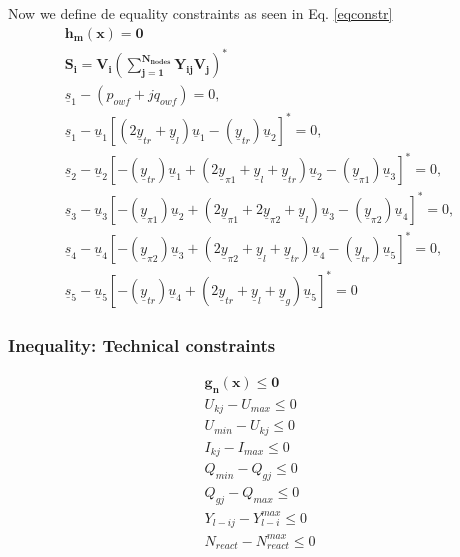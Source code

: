 \documentclass[a4paper,11pt, titlepage, twoside]{article}
\begin{document}
Now we define de equality constraints as seen in  Eq. \ref{eqconstr}
\begin{gather}
    \mathbf{h_m(x) = 0 } \label{eqconstr} \\
    \mathbf{S_i} = \mathbf{V_i(\sum_{j=1}^{N_{nodes}}Y_{ij}V_j)^*} \\
    \underline{s}_1-(p_{owf}+jq_{owf}) = 0, \nonumber \\
    \underline{s}_1-\underline{u}_1[(2\underline{y}_{tr}+\underline{y}_l)\underline{u}_1-(\underline{y}_{tr})\underline{u}_2]^* = 0, \nonumber \\
    \underline{s}_2-\underline{u}_2[-(\underline{y}_{tr})\underline{u}_1+(2\underline{y}_{\pi1}+\underline{y}_l+\underline{y}_{tr})\underline{u}_2-(\underline{y}_{\pi1})\underline{u}_3]^* = 0, \nonumber \\
    \underline{s}_3-\underline{u}_3[-(\underline{y}_{\pi1})\underline{u}_2+(2\underline{y}_{\pi1}+2\underline{y}_{\pi2}+\underline{y}_{l})\underline{u}_3-(\underline{y}_{\pi2})\underline{u}_4]^* = 0, \nonumber \\
    \underline{s}_4-\underline{u}_4[-(\underline{y}_{\pi2})\underline{u}_3+(2\underline{y}_{\pi2}+\underline{y}_l+\underline{y}_{tr})\underline{u}_4-(\underline{y}_{tr})\underline{u}_5]^* = 0, \nonumber \\
    \underline{s}_5-\underline{u}_5[-(\underline{y}_{tr})\underline{u}_4+(2\underline{y}_{tr}+\underline{y}_l+\underline{y}_{g})\underline{u}_5]^* = 0
\end{gather}

\newpage



\subsubsection{Inequality: Technical constraints}\label{inequality}

\begin{gather}
    \mathbf{g_n(x)\leq0} \\
    U_{kj}-U_{max}\leq0 \\
    U_{min}-U_{kj}\leq0 \\
    I_{kj}-I_{max}\leq0 \\
    Q_{min}-Q_{gj}\leq0 \\
    Q_{gj}-Q_{max}\leq0 \\
    Y_{l-ij}-Y_{l-i}^{max}\leq0 \\
    N_{react}-N_{react}^{max}\leq0 \\
\end{gather}
\end{document}
